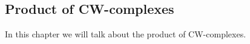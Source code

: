 \subsection{Product of CW-complexes}
In this chapter we will talk about the product of CW-complexes.



